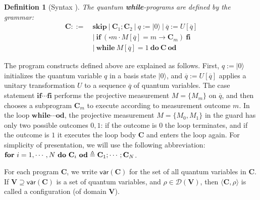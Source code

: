 \documentclass[conference,compsoc, 10pt]{IEEEtran}
\newtheorem{definition}{Definition}[section]
\newcommand {\qbar} {{\overline{q}}}
\newcommand {\qU} {{\overline{q}:=U[\overline{q}]}}
\newcommand {\vars } {\mathbf{V}}
\newcommand {\var } {\mathsf{var}}
\newcommand {\prog } {{\mathbf{C}}}
\begin{document}
	\begin{definition}[Syntax \cite{Ying11}]\label{q-syntax}
		The quantum \textbf{while}-programs are defined by
		the grammar:
		\begin{align*} \prog::=\ &\mathbf{skip}\  |\ \prog_1;\prog_2\ |\ q:=|0\rangle\ |\ \qU \\
		&|\ \mathbf{if}\ \left(\square m\cdot M[\qbar] =m\rightarrow \prog_m\right)\ \mathbf{fi}\\ 
		 &|\ \mathbf{while}\ M[\qbar]=1\ \mathbf{do}\ \prog\ \mathbf{od}
		\end{align*}
	\end{definition}
	
	The program constructs defined above are explained as follows. First, $q:=|0\rangle$
  initializes the quantum variable $q$ in a basis state $|0\rangle$, and $\qU$
  applies a unitary transformation $U$ to a sequence $\qbar$ of quantum
  variables. The case statement $\mathbf{if}\cdots\mathbf{fi}$ performs the
  projective measurement $M = \{M_m\}$ on $\qbar$, and then chooses a subprogram
  $\prog_m$ to execute according to measurement outcome $m$. In the loop $\mathbf{while}\cdots\mathbf{od}$, the projective measurement $M = \{M_0, M_1\}$ in the guard has only two possible outcomes $0,1$: if the outcome is $0$ the loop terminates, and if the outcome is $1$ it executes the loop body $\prog$ and enters the loop again. For simplicity of presentation, we will use the following abbreviation:
	${\bf for}\ i = 1,\cdots,N\ {\bf do}\ \prog_i\ {\bf od}\triangleq \prog_1;\cdots;\prog_N$.
	
	For each program $\prog$, we write $\var(\prog)$ for the set of all quantum variables in $\prog$. If $\vars\supseteq\var(\prog)$ is a set of quantum variables, and $\rho\in\mathcal{D}(\vars)$, then
	$\langle \prog,\rho\rangle$ is called a configuration (of domain $\vars$). %
	
\end{document}
